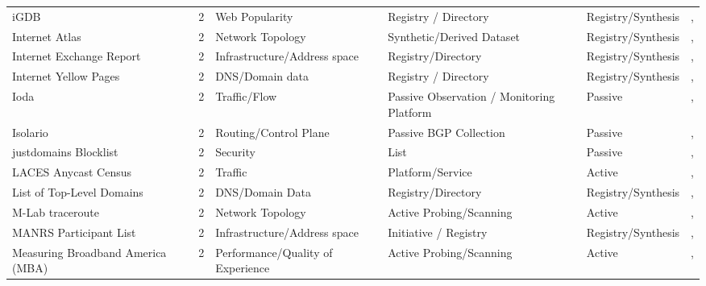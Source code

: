 \begin{table}[h!]
\begin{tabular}{lllllll}
iGDB & \cite{igdb} & 2 & Web Popularity & Registry / Directory & Registry/Synthesis & \cite{10.1145/3646547.3688429}, \cite{10.1145/3777912.3809135} \\
Internet Atlas & \cite{internet_atlas} & 2 & Network Topology & Synthetic/Derived Dataset & Registry/Synthesis & \cite{10.1145/3517745.3561443}, \cite{10.1007/978-3-030-72582-2_15} \\
Internet Exchange Report & \cite{he_ix_report} & 2 & Infrastructure/Address space & Registry/Directory & Registry/Synthesis & \cite{10.1145/3517745.3561443}, \cite{10.1007/978-3-030-98785-5_16} \\
Internet Yellow Pages & \cite{10.1145/3646547.3688444} & 2 & DNS/Domain data & Registry / Directory & Registry/Synthesis & \cite{10.1007/978-3-031-85960-1_13}, \cite{10.1145/3777912.3809141} \\
Ioda & \cite{ioda} & 2 & Traffic/Flow & Passive Observation / Monitoring Platform & Passive & \cite{10.1007/978-3-031-85960-1_13}, \cite{10.1145/3777912.3809143} \\
Isolario & \cite{isolario_project} & 2 & Routing/Control Plane & Passive BGP Collection & Passive & \cite{10.1145/3487552.3487865}, \cite{10.1007/978-3-030-98785-5_10} \\
justdomains Blocklist & \cite{justdomains_blocklist} & 2 & Security & List & Passive & \cite{10.1007/978-3-031-28486-1_26}, \cite{10.1007/978-3-031-85960-1_8} \\
LACES Anycast Census & \cite{10.1145/3730567.3764484} & 2 & Traffic & Platform/Service & Active & \cite{10.1145/3777912.3839831}, \cite{10.1145/3777912.3839828} \\
List of Top-Level Domains & \cite{icann_tlds} & 2 & DNS/Domain Data & Registry/Directory & Registry/Synthesis & \cite{10.1007/978-3-031-28486-1_22}, \cite{10.1007/978-3-031-56249-5_9} \\
M-Lab traceroute & \cite{mlab_traceroute} & 2 & Network Topology & Active Probing/Scanning & Active & \cite{10.1145/3618257.3624809}, \cite{10.1145/3517745.3561449} \\
MANRS Participant List & \cite{manrs} & 2 & Infrastructure/Address space & Initiative / Registry & Registry/Synthesis & \cite{10.1007/978-3-030-98785-5_14}, \cite{10.1145/3517745.3561419} \\
Measuring Broadband America (MBA) & \cite{measuring_broadband_america} & 2 & Performance/Quality of Experience & Active Probing/Scanning & Active & \cite{10.1145/3517745.3561441}, \cite{10.1007/978-3-030-72582-2_2} \\

\end{tabular}
\end{table}
